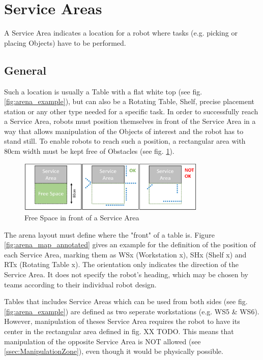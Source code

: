 \clearpage

\section{Service Areas}
\label{sec:Service_Areas}
A Service Area indicates a location for a robot where tasks (e.g. picking or placing Objects) have to be performed.
\subsection{General} 
\label{subsec:Service_Areas_General}


Such a location is usually a Table with a flat white top (see fig. \ref{fig:arena_example}), but can also be a Rotating Table, Shelf, precise placement station or any other type needed for a specific task.
In order to successfully reach a Service Area, robots must position themselves in front of the Service Area in a way that allows manipulation of the Objects of interest and the robot has to stand still. To enable robots to reach such a position, a rectangular area with $80\si{\centi\meter}$ width must be kept free of Obstacles (see fig. \ref{fig:arena_service_area_free}). 

\begin{figure} [h!]
	\centering
	\includegraphics[width= 0.8\textwidth ]{./images/general_rules/arena_service_area_free_space}
	\caption{Free Space in front of a Service Area}
	\label{fig:arena_service_area_free}
\end{figure}

The arena layout must define where the "front" of a table is.
Figure \ref{fig:arena_map_annotated} gives an example for the definition of the position of each Service Area, marking them as WSx (Workstation x), SHx (Shelf x) and RTx (Rotating Table x). The orientation only indicates the direction of the Service Area. It does not specify the robot's heading, which may be chosen by teams according to their individual robot design.

Tables that includes Service Areas which can be used from both sides (see fig. \ref{fig:arena_example}) are defined as two seperate workstations (e.g. WS5 \& WS6). However, manipulation of theses Service Area requires the robot to have its center in the rectangular area defined in fig. XX TODO. This means that manipulation of the opposite Service Area is NOT allowed (see \ref{ssec:ManipulationZone}), even though it would be physically possible.

